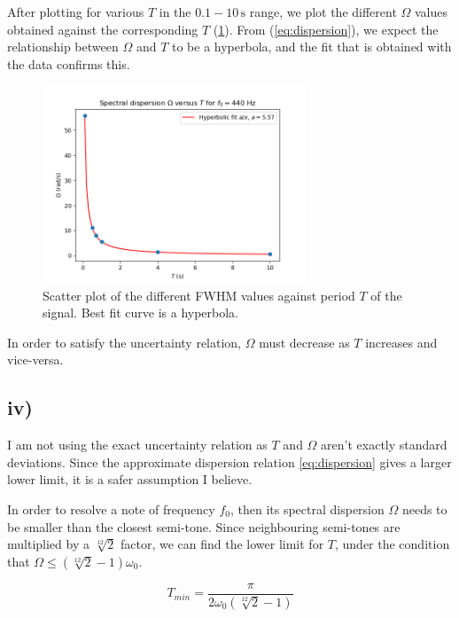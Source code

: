 \documentclass{article}
\begin{document}
After plotting for various $T$ in the $0.1 - 10  \,\si{\s}$ range, we plot the different $\Omega$ values obtained against the corresponding $T$ (\ref{fig:omeg_vs_T}). From (\ref{eq:dispersion}), we expect the relationship between $\Omega$ and $T$ to be a hyperbola, and the fit that is obtained with the data confirms this.

\begin{figure}
    \centering
    \includegraphics[width=0.7\textwidth]{figs/Omega_vs_T.png}
    \caption{Scatter plot of the different FWHM values against period $T$ of the signal. Best fit curve is a hyperbola.}
    \label{fig:omeg_vs_T}
\end{figure}

In order to satisfy the uncertainty relation, $\Omega$ must decrease as $T$ increases and vice-versa.

\subsection*{iv)}

I am not using the exact uncertainty relation as $T$ and $\Omega$ aren't exactly standard deviations. Since the approximate dispersion relation \ref{eq:dispersion} gives a larger lower limit, it is a safer assumption I believe.

In order to resolve a note of frequency $f_0$, then its spectral dispersion $\Omega$ needs to be smaller than the closest semi-tone. Since neighbouring semi-tones are multiplied by a $\sqrt[12]{2}$ factor, we can find the lower limit for $T$, under the condition that $\Omega \le (\sqrt[12]{2} - 1)\omega_0$.

\begin{equation}
    T_{min} = \frac{\pi}{2\omega_0(\sqrt[12]{2} - 1)}
\end{equation}
\end{document}
